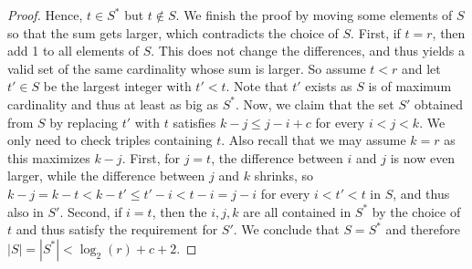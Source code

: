 \documentclass[11pt]{article}
\begin{document}
\begin{proof}
    Hence, $ t \in S^* $ but $ t \notin S $.
%
    We finish the proof by moving some elements of $ S $ so that the sum gets larger, which contradicts the choice of $ S $.
    First, if $ t = r $, then add 1 to all elements of $ S $.
    This does not change the differences, and thus yields a valid set of the same cardinality whose sum is larger.
    So assume $ t < r $ and let $ t' \in S $ be the largest integer with $ t' < t $.
    Note that $ t' $ exists as $ S $ is of maximum cardinality and thus at least as big as $ S^* $.
    Now, we claim that the set $ S' $ obtained from $ S $ by replacing $ t' $ with  $t$ satisfies $ k - j \leq j - i + c $ for every $ i < j < k $.
    We only need to check triples containing $ t $.
    Also recall that we may assume $ k = r $ as this maximizes $ k - j $.
    First, for $ j = t $, the difference between $ i $ and $ j $ is now even larger, while the difference between $ j $ and $ k $ shrinks, so $ k - j = k - t < k - t' \leq t' - i < t - i = j - i $ for every $ i < t' < t$ in $ S $, and thus also in $ S' $.
    Second, if $ i = t $, then the $ i, j, k $ are all contained in $ S^* $ by the choice of $ t $ and thus satisfy the requirement for $ S' $.
    We conclude that $ S = S^* $ and therefore $ |S| = |S^*| < \log_2(r) + c + 2 $.
\end{proof}
%
%
%
\end{document}
